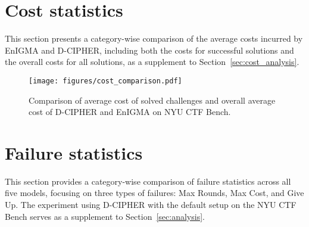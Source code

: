 
\section{Cost statistics}
\label{sec:appendix_cost}
This section presents a category-wise comparison of the average costs incurred by EnIGMA and D-CIPHER, including both the costs for successful solutions and the overall costs for all solutions, as a supplement to Section~\ref{sec:cost_analysis}.




\begin{figure}[H]
    \centering
    \vspace{-4mm}
    \texttt{[image: figures/cost\_comparison.pdf]}
    \label{fig:cost_compare_bar}
    \caption{Comparison of average cost of solved challenges and overall average cost of D-CIPHER and EnIGMA on NYU CTF Bench.}
\end{figure}

\section{Failure statistics}
\label{sec:appendix_failure}
This section provides a category-wise comparison of failure statistics across all five models, focusing on three types of failures: Max Rounds, Max Cost, and Give Up. The experiment using D-CIPHER with the default setup on the NYU CTF Bench serves as a supplement to Section~\ref{sec:analysis}.



